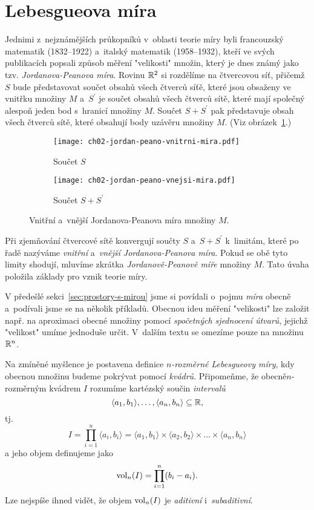 \section{Lebesgueova míra}\label{sec:lebesgueova-mira}

Jednimi z~nejznámějších průkopníků v~oblasti teorie míry byli francouzský matematik  (1832--1922) a~italský matematik  (1958--1932), kteří ve svých publikacích popsali způsob měření "velikosti" množin, který je dnes známý jako tzv. \emph{Jordanova-Peanova míra}. Rovinu $\mathbb{R}^2$ si rozdělíme na čtvercovou síť, přičemž $S$ bude představovat součet obsahů všech čtverců síťě, které jsou obsaženy ve vnitřku množiny $M$ a~$S^\prime$ je součet obsahů všech čtverců sítě, které mají společný alespoň jeden bod s~hranicí množiny $M$. Součet $S+S^\prime$ pak představuje obsah všech čtverců sítě, které obsahují body uzávěru množiny $M$. (Viz obrázek~\ref{fig:jordan-peano-mira}.)
\begin{figure}[h]
    \centering
    \begin{subfigure}{0.4\textwidth}
        \centering
        \texttt{[image: ch02-jordan-peano-vnitrni-mira.pdf]}
        \caption{Součet $S$}
    \end{subfigure}
    \qquad
    \begin{subfigure}{0.4\textwidth}
        \centering
        \texttt{[image: ch02-jordan-peano-vnejsi-mira.pdf]}
        \caption{Součet $S+S^\prime$}
    \end{subfigure}
    \caption{Vnitřní a~vnější Jordanova-Peanova míra množiny $M$.}
    \label{fig:jordan-peano-mira}
\end{figure}
Při zjemňování čtvercové sítě konvergují součty $S$ a~$S+S^\prime$ k~limitám, které po řadě nazýváme \emph{vnitřní} a~\emph{vnější Jordanova-Peanova míra}. Pokud se obě tyto limity shodují, mluvíme zkrátka \emph{Jordanově-Peanově míře} množiny $M$. Tato úvaha položila základy pro vznik teorie míry. \cite{Sarmanova1996}

V předešlé sekci~\ref{sec:prostory-s-mirou} jsme si povídali o~pojmu \emph{míra} obecně a~podívali jsme se na několik příkladů. Obecnou ideu měření "velikosti" lze založit např. na aproximaci obecné množiny pomocí \emph{spočetných sjednocení útvarů}, jejichž "velikost" umíme jednoduše určit. V~dalším textu se omezíme pouze na množinu $\mathbb{R}^n$.

Na zmíněné myšlence je postavena definice \emph{$n$-rozměrné Lebesgueovy míry}, kdy obecnou množinu budeme pokrývat pomocí \emph{kvádrů}. Připomeňme, že obecně\linebreak\mbox{$n$-rozměrným} kvádrem $I$ rozumíme kartézský součin \emph{intervalů}
\[\langle a_1,b_1\rangle,\ldots,\langle a_n,b_n\rangle\subseteq\mathbb{R},\]
tj.
\[I=\prod_{i=1}^{n}\langle a_i,b_i\rangle=\langle a_1,b_1\rangle\times\langle a_2,b_2\rangle\times\dots\times\langle a_n,b_n\rangle\]
a jeho objem definujeme jako
\[\operatorname{vol}_n(I)=\prod_{i=1}^{n}(b_i-a_i).\]
Lze nejspíše ihned vidět, že objem $\operatorname{vol}_n(I)$ je \emph{aditivní} i~\textit{subaditivní}.

